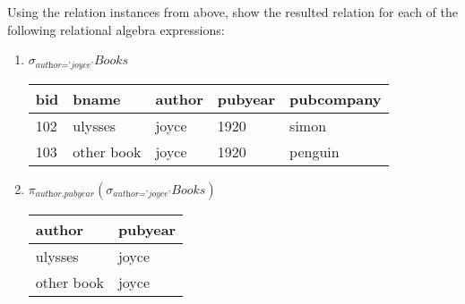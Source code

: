 \documentclass[letterpaper, 11pt]{article}
\begin{document}
Using the relation instances from above, show the resulted relation for each of the following relational algebra expressions:
\begin{enumerate}[label={\alph*}),leftmargin=*]
    \item $\sigma_{\textit{author='joyce'}}\textit{Books}$
    \begin{table}[H]
        \centering
        \begin{tabular}{|l|l|l|l|l|}
        \hline
            \cellcolor[HTML]{b4c6e7} bid & \cellcolor[HTML]{b4c6e7} bname & \cellcolor[HTML]{b4c6e7} author & \cellcolor[HTML]{b4c6e7} pubyear & \cellcolor[HTML]{b4c6e7} pubcompany \\
            \hline
            102 & ulysses & joyce & 1920 & simon \\
            \hline
            103 & other book & joyce & 1920 & penguin \\
            \hline
        \end{tabular}
    \end{table}
    
    \item $\pi_{\textit{author,pubyear}}(\sigma_{\textit{author='joyce'}}\textit{Books})$
    \begin{table}[H]
        \centering
        \begin{tabular}{|l|l|}
        \hline
            \cellcolor[HTML]{b4c6e7} author & \cellcolor[HTML]{b4c6e7} pubyear \\
            \hline
            ulysses & joyce \\
            \hline
            other book & joyce \\
            \hline
        \end{tabular}
    \end{table}
    

\end{enumerate}
\end{document}

